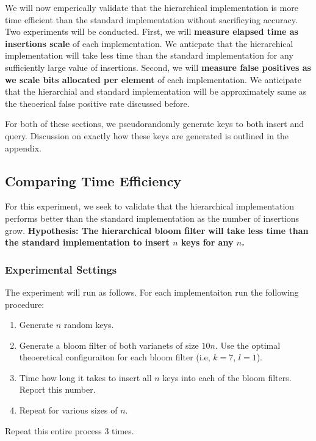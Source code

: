 We will now emperically validate that the hierarchical implementation is more time efficient than the standard implementation without sacrificying accuracy.
Two experiments will be conducted.
First, we will \textbf{measure elapsed time as insertions scale} of each implementation.
We anticpate that the hierarchical implementation will take less time than the standard implementation for any sufficiently large value of insertions.
Second, we will \textbf{measure false positives as we scale bits allocated per element} of each implementation.
We anticipate that the hierarchial and standard implementation will be approximately same as the theoerical false positive rate discussed before.

For both of these sections, we pseudorandomly generate keys to both insert and query.
Discussion on exactly how these keys are generated is outlined in the appendix.


\subsection{Comparing Time Efficiency}

For this experiment, we seek to validate that the hierarchical implementation performs better than the standard implementation as the number of insertions grow.
\textbf{Hypothesis: The hierarchical bloom filter will take less time than the standard implementation to insert $n$ keys for any $n$.}

\subsubsection{Experimental Settings}

The experiment will run as follows. For each implementaiton run the following procedure:
\begin{enumerate}
    \item Generate $n$ random keys.
    \item Generate a bloom filter of both varianets of size $10n$. Use the optimal theoeretical configuraiton for each bloom filter (i.e, $k=7$, $l=1$).
    \item Time how long it takes to insert all $n$ keys into each of the bloom filters. Report this number.
    \item Repeat for various sizes of $n$.
\end{enumerate}
Repeat this entire process $3$ times.

